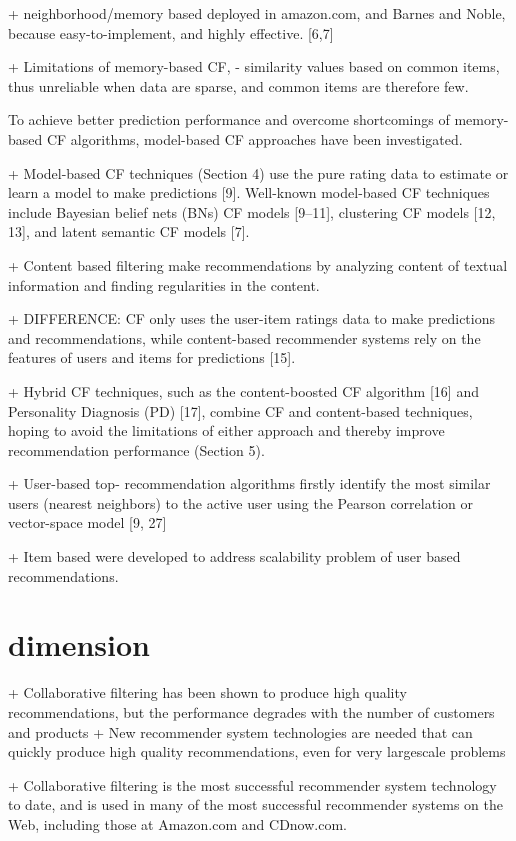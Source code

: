 + neighborhood/memory based deployed in amazon.com, and Barnes and Noble, because easy-to-implement, and highly effective. [6,7]

+ Limitations of memory-based CF,
 - similarity values based on common items, thus unreliable when data are sparse, and common items are therefore few. 
 
 To achieve better prediction performance and overcome shortcomings of memory-based CF algorithms, model-based CF approaches have been investigated.
 
 + Model-based CF techniques (Section 4) use the pure rating data to estimate or learn a model to make predictions [9]. Well-known model-based CF techniques include Bayesian belief nets (BNs) CF models [9–11], clustering CF models [12, 13], and latent semantic CF models [7].
 
 + Content based filtering make recommendations by analyzing content of textual information and finding regularities in the content. 

+ DIFFERENCE:  CF only uses the user-item ratings data to make predictions and recommendations, while content-based recommender systems rely on the features of users and items for predictions [15].

+ Hybrid CF techniques, such as the content-boosted CF algorithm [16] and Personality Diagnosis (PD) [17], combine CF and content-based techniques, hoping to avoid the limitations of either approach and thereby improve recommendation performance (Section 5).

+ User-based top- recommendation algorithms firstly identify the  most similar users (nearest neighbors) to the active user using the Pearson correlation or vector-space model [9, 27]

+ Item based were developed to address scalability problem of user based recommendations. 


\section{dimension}
\cite{dimension} 
\citeyear{dimension}
+ Collaborative filtering has been shown to produce high quality recommendations, but the performance degrades with the number of customers and products
+ New recommender system
technologies are needed that can quickly produce
high quality recommendations, even for very largescale
problems

+ Collaborative filtering is the most successful
recommender system technology to date, and is used
in many of the most successful recommender systems
on the Web, including those at Amazon.com and CDnow.com. 

